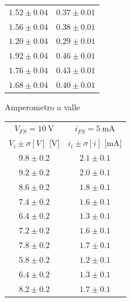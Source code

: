 \documentclass{article}
\begin{document}
\begin{figure}
\begin{multicols}{2}
\begin{center}
\begin{tabular}{c|c}
$1.52 \pm 0.04 $&$0.37 \pm 0.01$\\

$1.56 \pm 0.04 $&$0.38 \pm 0.01$\\

$1.20 \pm 0.04 $&$0.29 \pm 0.01$\\

$1.92 \pm 0.04 $&$0.46 \pm 0.01$\\

$1.76 \pm 0.04 $&$0.43 \pm 0.01$\\

$1.68 \pm 0.04 $&$0.40 \pm 0.01$\\

\end{tabular}
\end{center} 
\end{multicols}

\begin{center}
    \large{Amperometro a valle}
\end{center}
\begin{multicols}{2}
\begin{center}
\begin{tabular}{c|c} 
$V_{FS}=\SI{10}{\volt}$&$i_{FS}=\SI{5}{\milli\ampere}$\\
$V_i \pm \sigma [V]$ [\si{\volt}] & $i_i \pm \sigma [i]$ [\si{\milli\ampere}]\\
[0.5ex]
\hline
$9.8 \pm 0.2 $&$2.1 \pm 0.1$\\

$9.2 \pm 0.2 $&$2.0 \pm 0.1$\\

$8.6 \pm 0.2 $&$1.8 \pm 0.1$\\

$7.4 \pm 0.2 $&$1.6 \pm 0.1$\\

$6.4 \pm 0.2 $&$1.3 \pm 0.1$\\

$7.2 \pm 0.2 $&$1.6 \pm 0.1$\\

$7.8 \pm 0.2 $&$1.7 \pm 0.1$\\

$5.8 \pm 0.2 $&$1.2 \pm 0.1$\\

$6.4 \pm 0.2 $&$1.3 \pm 0.1$\\

$8.2 \pm 0.2 $&$1.7 \pm 0.1$\\

\end{tabular}
\end{center} 


\end{multicols}
\end{figure}
\end{document}
